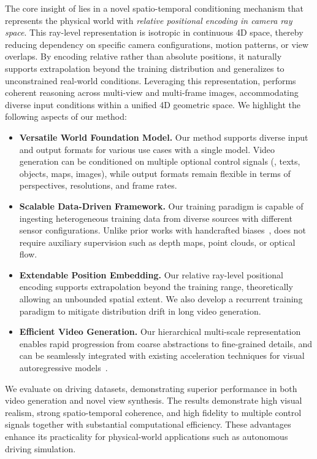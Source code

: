  The core insight of \ourmethod{} lies in a novel spatio-temporal conditioning mechanism that represents the physical world with \textit{relative positional encoding in camera ray space}. This ray-level representation is isotropic in continuous 4D space, thereby reducing dependency on specific camera configurations, motion patterns, or view overlaps. By encoding relative rather than absolute positions, it naturally supports extrapolation beyond the training distribution and generalizes to unconstrained real-world conditions. Leveraging this representation, \ourmethod{} performs coherent reasoning across multi-view and multi-frame images, accommodating diverse input conditions within a unified 4D geometric space. We highlight the following aspects of our method:
\begin{itemize}
    \item \textbf{Versatile World Foundation Model.} Our method supports diverse input and output formats for various use cases with a single model. Video generation can be conditioned on multiple optional control signals (\eg, texts, objects, maps, images), while output formats remain flexible in terms of perspectives, resolutions, and frame rates.
    \item \textbf{Scalable Data-Driven Framework.} Our training paradigm is capable of ingesting heterogeneous training data from diverse sources with different sensor configurations. Unlike prior works with handcrafted biases~\cite{guo2025dist4ddisentangledspatiotemporaldiffusion,chen2025geodrive}, \ourmethod{} does not require auxiliary supervision such as depth maps, point clouds, or optical flow.
    \item \textbf{Extendable Position Embedding.} Our relative ray-level positional encoding supports extrapolation beyond the training range, theoretically allowing an unbounded spatial extent. We also develop a recurrent training paradigm to mitigate distribution drift in long video generation.
    \item \textbf{Efficient Video Generation.} Our hierarchical multi-scale representation enables rapid progression from coarse abstractions to fine-grained details, and can be seamlessly integrated with existing acceleration techniques for visual autoregressive models~\cite{guo2025fastvar}.
\end{itemize}

We evaluate \ourmethod{} on driving datasets, demonstrating superior performance in both video generation and novel view synthesis. The results demonstrate high visual realism, strong spatio-temporal coherence, and high fidelity to multiple control signals together with substantial computational efficiency. These advantages enhance its practicality for physical-world applications such as autonomous driving simulation.
